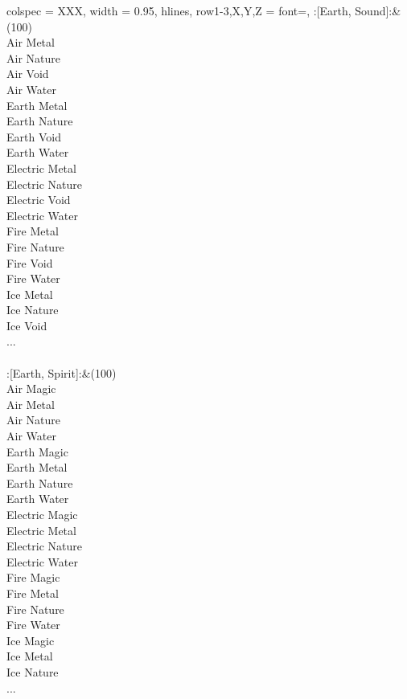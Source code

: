 \begin{longtblr}[
	caption = {2v2 Defending Weak},
	label = {2v2-Defending-Weak},
]{
	colspec = {XXX}, width = 0.95\linewidth,
	hlines,
	row{1-3,X,Y,Z} = {font=\bfseries},
}
	:[Earth, Sound]:&{(100)\\
	Air Metal \\
	Air Nature \\
	Air Void \\
	Air Water \\
	Earth Metal \\
	Earth Nature \\
	Earth Void \\
	Earth Water \\
	Electric Metal \\
	Electric Nature \\
	Electric Void \\
	Electric Water \\
	Fire Metal \\
	Fire Nature \\
	Fire Void \\
	Fire Water \\
	Ice Metal \\
	Ice Nature \\
	Ice Void \\
	...\\
	}\\

	:[Earth, Spirit]:&{(100)\\
	Air Magic \\
	Air Metal \\
	Air Nature \\
	Air Water \\
	Earth Magic \\
	Earth Metal \\
	Earth Nature \\
	Earth Water \\
	Electric Magic \\
	Electric Metal \\
	Electric Nature \\
	Electric Water \\
	Fire Magic \\
	Fire Metal \\
	Fire Nature \\
	Fire Water \\
	Ice Magic \\
	Ice Metal \\
	Ice Nature \\
	...\\
	}\\


\end{longtblr}
